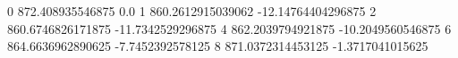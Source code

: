 0 872.408935546875 0.0
1 860.2612915039062 -12.14764404296875
2 860.6746826171875 -11.7342529296875
4 862.2039794921875 -10.2049560546875
6 864.6636962890625 -7.7452392578125
8 871.0372314453125 -1.3717041015625
